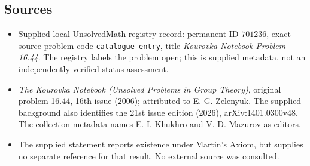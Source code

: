 \documentclass[11pt]{article}
\begin{document}
\subsection{Sources}
\begin{itemize}
\item Supplied local UnsolvedMath registry record: permanent ID \(701236\), exact source problem code \texttt{catalogue entry}, title \emph{Kourovka Notebook Problem 16.44}. The registry labels the problem open; this is supplied metadata, not an independently verified status assessment.
\item \emph{The Kourovka Notebook (Unsolved Problems in Group Theory)}, original problem 16.44, 16th issue (2006); attributed to E. G. Zelenyuk. The supplied background also identifies the 21st issue edition (2026), arXiv:1401.0300v48. The collection metadata names E. I. Khukhro and V. D. Mazurov as editors.
\item The supplied statement reports existence under Martin's Axiom, but supplies no separate reference for that result. No external source was consulted.
\end{itemize}
\end{document}
